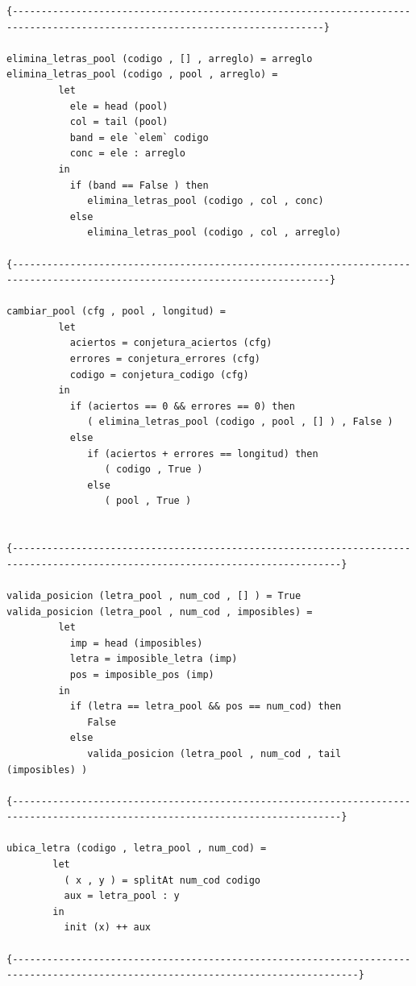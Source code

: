 \begin{itemize}
\begin{verbatim}
{----------------------------------------------------------------------------------------------------------------------------}

elimina_letras_pool (codigo , [] , arreglo) = arreglo
elimina_letras_pool (codigo , pool , arreglo) = 
         let
           ele = head (pool)
           col = tail (pool)
           band = ele `elem` codigo
           conc = ele : arreglo
         in
           if (band == False ) then
              elimina_letras_pool (codigo , col , conc)
           else
              elimina_letras_pool (codigo , col , arreglo)
           
{-----------------------------------------------------------------------------------------------------------------------------}

cambiar_pool (cfg , pool , longitud) =
         let
           aciertos = conjetura_aciertos (cfg)
           errores = conjetura_errores (cfg)
           codigo = conjetura_codigo (cfg)
         in
           if (aciertos == 0 && errores == 0) then
              ( elimina_letras_pool (codigo , pool , [] ) , False )
           else
              if (aciertos + errores == longitud) then
                 ( codigo , True )
              else
                 ( pool , True )


{-------------------------------------------------------------------------------------------------------------------------------}

valida_posicion (letra_pool , num_cod , [] ) = True
valida_posicion (letra_pool , num_cod , imposibles) = 
         let
           imp = head (imposibles)
           letra = imposible_letra (imp)
           pos = imposible_pos (imp)
         in
           if (letra == letra_pool && pos == num_cod) then
              False
           else
              valida_posicion (letra_pool , num_cod , tail (imposibles) )

{-------------------------------------------------------------------------------------------------------------------------------}  

ubica_letra (codigo , letra_pool , num_cod) =
        let
          ( x , y ) = splitAt num_cod codigo
          aux = letra_pool : y
        in
          init (x) ++ aux

{----------------------------------------------------------------------------------------------------------------------------------}


\end{verbatim}
\end{itemize}
